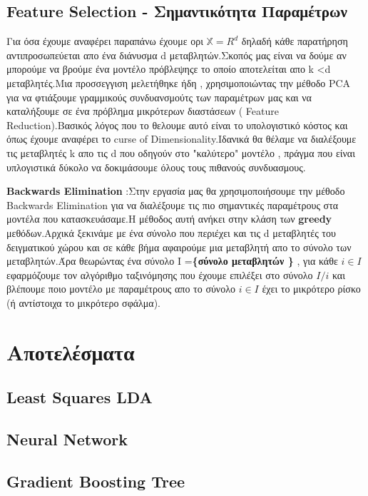 \documentclass[12pt,a4paper]{article}
\begin{document}
\subsection{Feature Selection - Σημαντικότητα Παραμέτρων}
Για όσα έχουμε αναφέρει παραπάνω έχουμε ορι $\mathbb{X} = R^d$ δηλαδή κάθε παρατήρηση αντιπροσωπεύεται απο ένα διάνυσμα d μεταβλητών.Σκοπός μας είναι να δούμε αν μπορούμε να βρούμε ένα μοντέλο πρόβλεψηςε το οποίο αποτελείται απο  k <d μεταβλητές.Μια προσσεγγιση μελετήθηκε ήδη , χρησιμοποιώντας την μέθοδο PCA για να φτιάξουμε γραμμικούς συνδυανσμούτς των παραμέτρων μας και να καταλήξουμε σε ένα πρόβλημα μικρότερων διαστάσεων ( Feature Reduction).Βασικός λόγος που το θελουμε αυτό είναι το υπολογιστικό κόστος και όπως έχουμε αναφέρει το curse of Dimensionality.Ιδανικά θα θέλαμε να διαλέξουμε τις μεταβλητές k απο τις d που οδηγούν στο  "καλύτερο" μοντέλο , πράγμα που είναι υπλογιστικά δύκολο να δοκιμάσουμε όλους τους πιθανούς συνδυασμους.

\par \textbf{Backwards Elimination} :Στην εργασία μας θα χρησιμοποιήσουμε την μέθοδο Backwards Elimination για να διαλέξουμε τις πιο σημαντικές παραμέτρους στα μοντέλα που κατασκευάσαμε.Η μέθοδος αυτή ανήκει στην κλάση των \textbf{greedy} μεθόδων.Αρχικά ξεκινάμε με ένα σύνολο που περιέχει και τις d μεταβλητές του δειγματικού χώρου και σε κάθε βήμα αφαιρούμε μια μεταβλητή απο το σύνολο των μεταβλητών.Άρα θεωρώντας ένα σύνολο  I =\textbf{\{σύνολο μεταβλητών \} } , για κάθε $i \in I $ εφαρμόζουμε τον αλγόριθμο ταξινόμησης που έχουμε επιλέξει στο σύνολο $I/{i}$ και βλέπουμε ποιο μοντέλο με παραμέτρους απο το σύνολο $i \in I  $ έχει το μικρότερο ρίσκο (ή αντίστοιχα το μικρότερο σφάλμα).


\section{Αποτελέσματα}

\subsection{Least Squares LDA}



\subsection{Neural Network}


\subsection{Gradient Boosting Tree}
\end{document}
